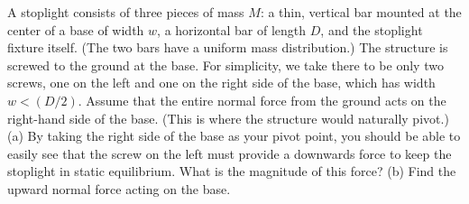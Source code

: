 A stoplight consists of three pieces of mass $M$: a thin, vertical bar
mounted at the center of a base of width $w$, a horizontal bar of
length $D$, and the stoplight fixture itself. (The two bars have a
uniform mass distribution.) The structure is screwed to the ground at the
base. For simplicity, we take there to be only two screws, one
on the left and one on the right side of the base, which has width $w < (D/2)$.
Assume that the entire normal force from the ground acts on the
right-hand side of the base. (This is where the structure would
naturally pivot.)\\
%
(a) By taking the right side of the base as your pivot point, you
should be able to easily see that the screw on the left must provide
a downwards force to keep the stoplight in static equilibrium. What
is the magnitude of this force?\answercheck\hwendpart
%
(b) Find the upward normal force acting on the base.\answercheck